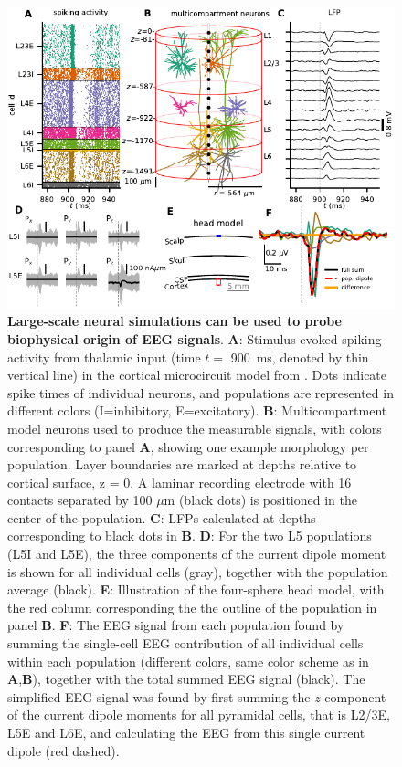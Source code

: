 \documentclass[preprint,10pt,authoryear]{elsarticle}
\begin{document}
\begin{figure}[H]
	\includegraphics[width=1.\textwidth]{hybrid_with_EEG}
	\caption{\textbf{Large-scale neural simulations can be used to probe biophysical origin of EEG signals}. 
		\textbf{A}: Stimulus-evoked spiking activity from thalamic input (time $t= $ 900~ms, denoted by thin vertical line) in the cortical microcircuit model from \cite{POTJANS2014}. Dots indicate spike times of individual neurons, and populations are represented in different colors (I=inhibitory, E=excitatory).
		\textbf{B}: Multicompartment model neurons used to produce the measurable signals, with colors corresponding to panel \textbf{A}, showing one example morphology per population. Layer boundaries are marked at depths relative to cortical surface, z = 0. A laminar recording electrode with 16 contacts separated by
		100 $\mu$m (black dots) is positioned in the center of the population.
		\textbf{C}: LFPs calculated at depths corresponding to black dots in \textbf{B}.
		\textbf{D}: For the two L5 populations (L5I and L5E), the three components of the current dipole moment is shown for all individual cells (gray), together with the population average (black).
		\textbf{E}: Illustration of the four-sphere head model, with the red column corresponding the the outline of the population in panel \textbf{B}.
		\textbf{F}: The EEG signal from each population found by summing the single-cell EEG contribution of all individual cells within each population (different colors, same color scheme as in \textbf{A},\textbf{B}), together with the total summed EEG signal (black). The simplified EEG signal was found by first summing the $z$-component of the current dipole moments for all pyramidal cells, that is L2/3E, L5E and L6E, and calculating the EEG from this single current dipole (red dashed).
	}
	\label{fig:population}
\end{figure}
\end{document}
